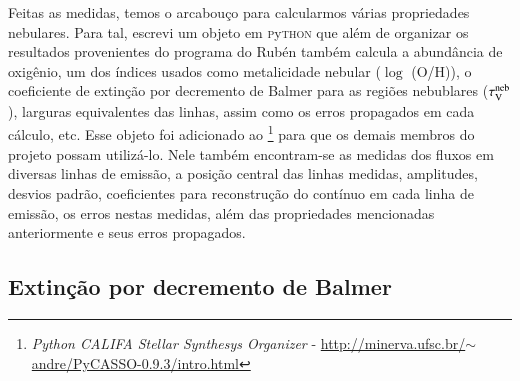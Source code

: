Feitas as medidas, temos o arcabouço para calcularmos várias propriedades nebulares. Para tal,
escrevi um objeto em \textsc{p}y\textsc{thon} que além de organizar os resultados provenientes do
programa do Rubén também calcula a abundância de oxigênio, um dos índices usados como metalicidade
nebular ($\log$ (O/H)), o coeficiente de extinção por decremento de Balmer para as regiões
nebublares ($\tau_{\mathrm{V}}^{\mathrm{neb}}$), larguras equivalentes das linhas, assim como os erros propagados em cada
cálculo, etc. Esse objeto foi adicionado ao \pycasso\footnote{
	{\em Python CALIFA Stellar Synthesys Organizer} -
\href{
	http://minerva.ufsc.br/~andre/PyCASSO-0.9.3/intro.html
}{
	http://minerva.ufsc.br/$\sim$andre/PyCASSO-0.9.3/intro.html}
}
\citep{CidFernandes.etal.2013a} para que os demais membros do projeto possam utilizá-lo. Nele também
encontram-se as medidas dos fluxos em diversas linhas de emissão, a posição central das linhas
medidas, amplitudes, desvios padrão, coeficientes para reconstrução do contínuo em cada linha de
emissão, os erros nestas medidas, além das propriedades mencionadas anteriormente e seus erros
propagados.

\subsection{Extinção por decremento de Balmer}
\label{sec:emline:datacube:tauvneb}

